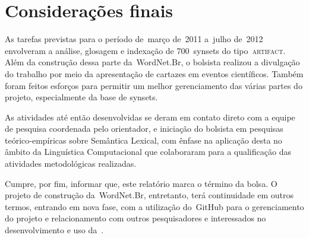 \chapter{Considerações finais}

% 
% 

As tarefas previstas para o período de~março de~2011 a~julho de~2012 envolveram
a análise, glosagem e indexação de 700~synsets do tipo~\textsc{artifact}. Além
da construção dessa parte da~WordNet.Br, o bolsista realizou a divulgação do
trabalho por meio da apresentação de cartazes em eventos científicos. Também
foram feitos esforços para permitir um melhor gerenciamento das várias partes
do projeto, especialmente da base de synsets.

\enlargethispage{\baselineskip}

As atividades até então desenvolvidas se deram em contato direto com a equipe
de pesquisa coordenada pelo orientador, e iniciação do bolsista em pesquisas
teórico-empíricas sobre Semântica Lexical, com ênfase na aplicação desta no
âmbito da Linguística Computacional que colaboraram para a qualificação das
atividades metodológicas realizadas.

Cumpre, por fim, informar que, este relatório marca o término da bolsa. O
projeto de construção da~WordNet.Br, entretanto, terá continuidade em outros
termos, entrando em nova fase, com a utilização do~GitHub para o gerenciamento
do projeto e relacionamento com outros pesquisadores e interessados no
  desenvolvimento e uso da~\wnbr.
